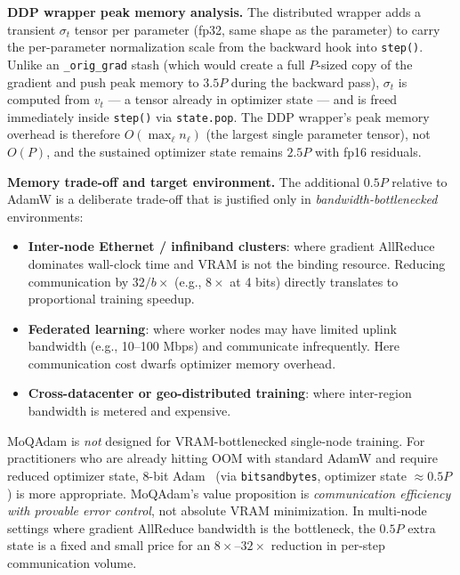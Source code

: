 \documentclass[10pt,twocolumn]{article}
\begin{document}
\textbf{DDP wrapper peak memory analysis.}
The distributed wrapper adds a transient $\sigma_t$ tensor per parameter
(fp32, same shape as the parameter) to carry the per-parameter normalization
scale from the backward hook into \texttt{step()}.  Unlike an
\texttt{\_orig\_grad} stash (which would create a full $P$-sized copy of
the gradient and push peak memory to $3.5P$ during the backward pass),
$\sigma_t$ is computed from $v_t$ — a tensor already in optimizer state —
and is freed immediately inside \texttt{step()} via \texttt{state.pop}.
The DDP wrapper's peak memory overhead is therefore $O(\max_\ell n_\ell)$
(the largest single parameter tensor), not $O(P)$, and the sustained
optimizer state remains $2.5P$ with fp16 residuals.

\textbf{Memory trade-off and target environment.}
The additional $0.5P$ relative to AdamW is a deliberate trade-off that
is justified only in \emph{bandwidth-bottlenecked} environments:

\begin{itemize}
  \item \textbf{Inter-node Ethernet / infiniband clusters}: where gradient
    AllReduce dominates wall-clock time and VRAM is not the binding
    resource.  Reducing communication by $32/b\times$ (e.g., $8\times$
    at 4 bits) directly translates to proportional training speedup.
  \item \textbf{Federated learning}: where worker nodes may have limited
    uplink bandwidth (e.g., 10--100 Mbps) and communicate infrequently.
    Here communication cost dwarfs optimizer memory overhead.
  \item \textbf{Cross-datacenter or geo-distributed training}: where
    inter-region bandwidth is metered and expensive.
\end{itemize}

MoQAdam is \emph{not} designed for VRAM-bottlenecked single-node training.
For practitioners who are already hitting OOM with standard AdamW and
require reduced optimizer state, 8-bit Adam~\cite{dettmers20228bit}
(via \texttt{bitsandbytes}, optimizer state $\approx 0.5P$) is more
appropriate.  MoQAdam's value proposition is \emph{communication efficiency
with provable error control}, not absolute VRAM minimization.  In
multi-node settings where gradient AllReduce bandwidth is the bottleneck,
the $0.5P$ extra state is a fixed and small price for an $8\times$--$32\times$
reduction in per-step communication volume.
\end{document}
